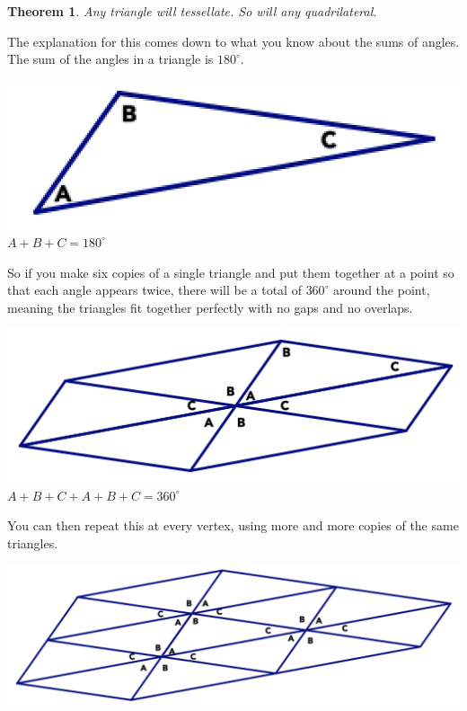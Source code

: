 \documentclass[12pt, reqno]{amsart}
\newtheorem*{thm*}{Theorem}
\theoremstyle{remark}
\theoremstyle{definition}
\numberwithin{equation}{section}  %
\begin{document}
\begin{thm*}
Any triangle will tessellate.  So will any quadrilateral.
\end{thm*}

The explanation for this comes down to what you know about the sums of angles.   The sum of the angles in a triangle is $180^\circ$. 

\begin{center}
\includegraphics[scale=0.55]{tesstri1}\\
$A+B+C=180^\circ$

\end{center}



 So if you make six copies of a single triangle and put them together at a point so that each angle appears twice, there will be a total of $360^\circ$ around the point, meaning the triangles fit together perfectly with no gaps and no overlaps.  

\begin{center}
\includegraphics[scale=0.55]{tesstri2}\\
$A+B+C + A+B+C=360^\circ$

\end{center}


You can then repeat this at every vertex, using more and more copies of the same triangles.

\begin{center}
\includegraphics[scale=0.55]{tesstri3}\\

\end{center}
\end{document}
